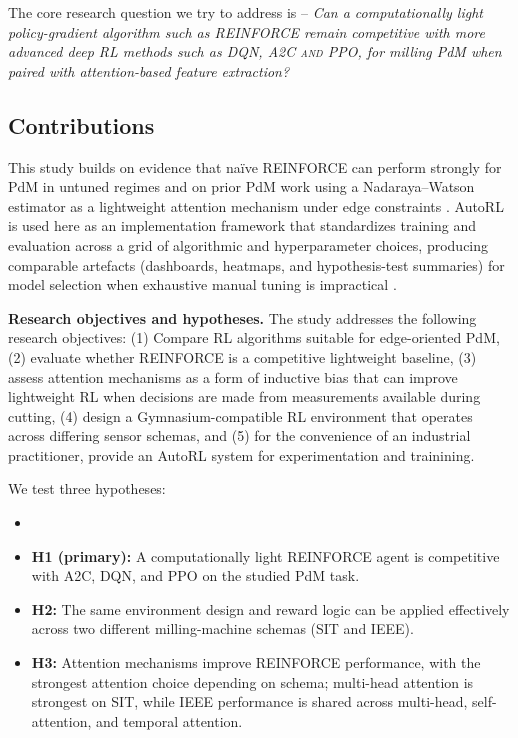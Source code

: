 \documentclass[sn-basic]{sn-jnl} %
\begin{document}
The core research question we try to address is -- \emph{Can a computationally light policy-gradient algorithm such as \textsc{REINFORCE} remain competitive with more advanced deep RL methods such as \textsc{DQN, A2C and PPO}, for milling PdM when paired with attention-based feature extraction?}

\subsection{Contributions}

This study builds on evidence that na\"{i}ve \textsc{REINFORCE} can perform strongly for PdM in untuned regimes \cite{Siraskar2025} and on prior PdM work using a Nadaraya--Watson estimator as a lightweight attention mechanism under edge constraints \cite{Siraskar2024}. AutoRL is used here as an implementation framework that standardizes training and evaluation across a grid of algorithmic and hyperparameter choices, producing comparable artefacts (dashboards, heatmaps, and hypothesis-test summaries) for model selection when exhaustive manual tuning is impractical \cite{Schwartz2020, Strubell2019, Faust2019, Mussi2022}.

\textbf{Research objectives and hypotheses.}
The study addresses the following research objectives: (1) Compare RL algorithms suitable for edge-oriented PdM, (2) evaluate whether \textsc{REINFORCE} is a competitive lightweight baseline, (3) assess attention mechanisms as a form of inductive bias that can improve lightweight RL when decisions are made from measurements available during cutting, (4) design a Gymnasium-compatible RL environment that operates across differing sensor schemas, and (5) for the convenience of an industrial practitioner, provide an AutoRL system for experimentation and trainining.

We test three hypotheses:
\begin{itemize}
        \item \item \textbf{H1 (primary):} A computationally light \textsc{REINFORCE} agent is competitive with \textsc{A2C}, \textsc{DQN}, and \textsc{PPO} on the studied PdM task.
        \item \textbf{H2:} The same environment design and reward logic can be applied effectively across two different milling-machine schemas (SIT and IEEE).
        \item \textbf{H3:} Attention mechanisms improve \textsc{REINFORCE} performance, with the strongest attention choice depending on schema; multi-head attention is strongest on SIT, while IEEE performance is shared across multi-head, self-attention, and temporal attention.
\end{itemize}
\end{document}

